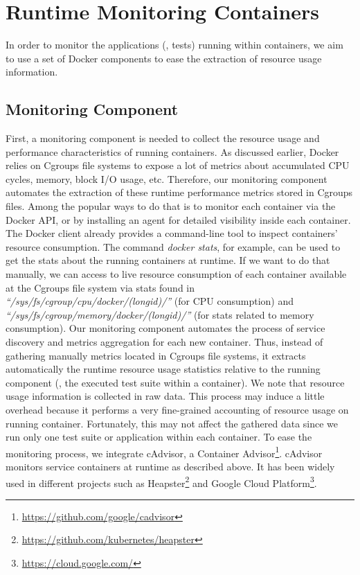 





\section{Runtime Monitoring Containers}
\label{mon:Runtime Testing}
In order to monitor the applications (\ie, tests) running within containers, we aim to use a set of Docker components to ease the extraction of resource usage information.


\subsection{Monitoring Component}
First, a monitoring component is needed to collect the resource usage and performance characteristics of running containers. As discussed earlier, Docker relies on Cgroups file systems to expose a lot of metrics about accumulated CPU cycles, memory, block I/O usage, etc. Therefore, our monitoring component automates the extraction of these runtime performance metrics stored in Cgroups files. 
Among the popular ways to do that is to monitor each container via the Docker API, or by installing an agent for detailed visibility inside each container. 
The Docker client already provides a command-line tool to inspect containers' resource consumption. The command \textit{docker stats}, for example, can be used to get the stats about the running containers at runtime. 
If we want to do that manually, we can access to live resource consumption of each container available at the Cgroups file system via stats found in \textit{``/sys/fs/cgroup/cpu/docker/(longid)/''} (for CPU consumption) and \textit{``/sys/fs/cgroup/memory/docker/(longid)/''} (for stats related to memory consumption). Our monitoring component automates the process of service discovery and metrics aggregation for each new container. Thus, instead of gathering manually metrics located in Cgroups file systems, it extracts automatically the runtime resource usage statistics relative to the running component (\ie, the executed test suite within a container). We note that resource usage information is collected in raw data. This process may induce a little overhead because it performs a very fine-grained accounting of resource usage on running container. Fortunately, this may not affect the gathered data since we run only one test suite or application within each container.
To ease the monitoring process, we integrate cAdvisor, a Container Advisor\footnote{\url{https://github.com/google/cadvisor}}. cAdvisor monitors service containers at runtime as described above. It has been widely used in different projects such as Heapster\footnote{\url{https://github.com/kubernetes/heapster}} and Google Cloud Platform\footnote{\url{https://cloud.google.com/}}. 

